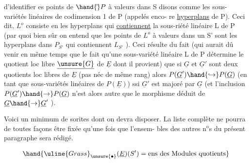  

 d'identifier es points de $\hand{\check{}}P$\hand{,} à valeurs dans  S disons\hand{,}
comme les sous-variétés linéaires de codimension 1 de P (appelés enco-%
re \uline{hyperplans} de P). Ceci dit, $L^{o}$ consiste en les hyperplans qui
\uline{contiennent} la sous-riété linéaire L de P (par quoi bien sûr on
entend que les points de $L^{o}$  à valeurs dans un S' sont les
hyperplans dans $P_{S'}$ qui contiennent $L_{S'}$ ). Ceci résulte du fait 
\placedmargin{|}(qui aurait dû venir en même temps que le fait qu'une sous-variété linéaire L de P\hand{,}
détermine le quotient loc libre $\underline{\unsure{G}}$ de $\underline{E}$ dont il provient) que si
$\underline{G}$ et $\underline{G}'$ sont deux quotients loc libres de $\underline{E}$ (pas néc de même rang)
alors $P(\underline{G}')\hand{\hookrightarrow}P(\underline{G})$ (en tant que sous-variétés linéaires de $P(\underline{E})$) ssi
$\underline{G}'$ est majoré par $\underline{G}$ (et l'inclusion $P(\underline{G}')\hand{\rightarrow}P(\underline{G})$ n'est alors autre
que le morphisme déduit de $\underline{G}\hand{\rightarrow}\underline{G}'$ ).

Voici un minimum de sorites dont on devra disposer. La liste
complète ne pourra de toutes façons être fixée qu'une fois que l'ensem-%
bles des autres n$^{\text{o}}$s du présent paragraphe sera rédigé.



\[ \hand{\uline{Grass}_{\unsure{\bullet}}(\underline{E})(S') = \text{ens des Modules quotients}} \]

\hand{sections de \uline{Grass}$_{\unsure{*}}(\underline{E})$ sur S [NB. le}

